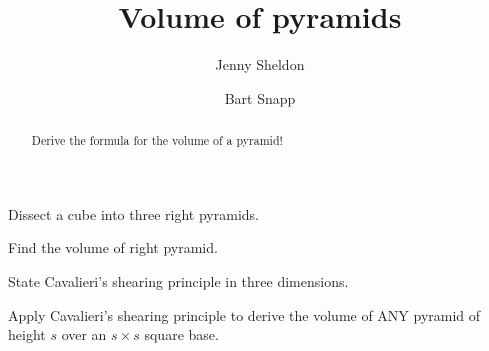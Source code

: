 \documentclass[nooutcomes,noauthor,handout,hints]{ximera}
\title{Volume of pyramids}
\author{Jenny Sheldon \and Bart Snapp}
\begin{document}
\begin{abstract}
  Derive the formula for the volume of a pyramid!
\end{abstract}
\maketitle


\begin{listOutcomes}
\item Dissect a cube into three right pyramids.
\item Find the volume of right pyramid.
\item State Cavalieri's shearing principle in three dimensions.
\item Apply Cavalieri's shearing principle to derive the volume of ANY pyramid
  of height $s$ over an $s\times s$ square base.
\end{listOutcomes}



\mynewpage
\end{document}
